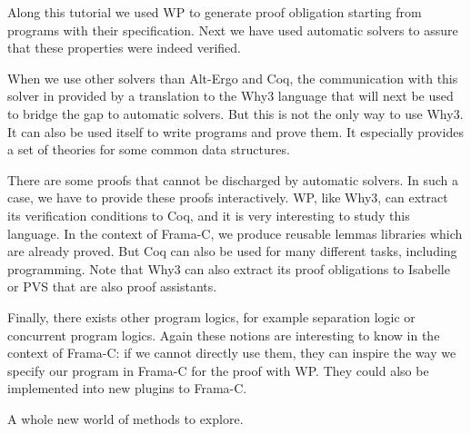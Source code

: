

Along this tutorial we used WP to generate proof obligation starting
from programs with their specification. Next we have used automatic
solvers to assure that these properties were indeed verified.

When we use other solvers than Alt-Ergo and Coq, the communication with
this solver in provided by a translation to the Why3 language that will
next be used to bridge the gap to automatic solvers. But this is not the
only way to use Why3. It can also be used itself to write programs and
prove them. It especially provides a set of theories for some common
data structures.

There are some proofs that cannot be discharged by automatic solvers. In
such a case, we have to provide these proofs interactively. WP, like
Why3, can extract its verification conditions to Coq, and it is very
interesting to study
this language. In the context of Frama-C, we produce reusable lemmas
libraries which are already proved. But Coq can also be used for many
different tasks, including programming. Note that Why3 can also extract
its proof obligations to Isabelle or PVS that are also proof assistants.

Finally, there exists other program logics, for example separation logic
or concurrent program logics. Again these notions are interesting to know
in the context of Frama-C: if we cannot directly use them, they can
inspire the way we specify our program in Frama-C for the proof with WP.
They could also be implemented into new plugins to Frama-C.

A whole new world of methods to explore.
